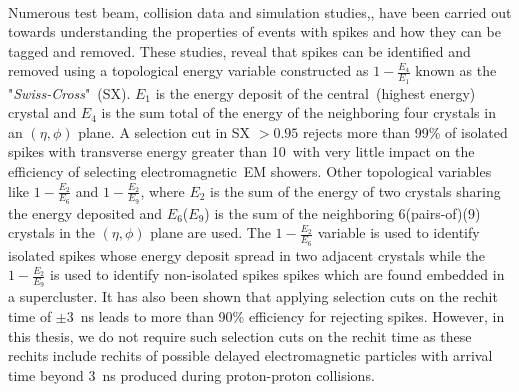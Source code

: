 \paragraph*{}
Numerous test beam, collision data and simulation studies,\cite{spike}, have been carried out towards understanding the properties of events with spikes and how they can be tagged and removed. 
These studies, reveal that spikes can be identified and removed using a topological energy variable constructed as $1 - \frac{E_{4}}{E_{1}}$ known as the "\textit{Swiss-Cross}"~(SX). $E_{1}$ is the energy deposit of the central~(highest energy) crystal and $E_{4}$ is the sum total of the energy of the neighboring four crystals in an $(\eta , \phi)$ plane. A selection cut in SX $ > 0.95$ rejects more than 99\% of isolated spikes with transverse energy greater than 10~\GeV with very little impact on the efficiency of selecting electromagnetic~{EM} showers.
Other topological variables like $ 1 - \frac{E_{2}}{E_{6}}$ and $ 1 - \frac{E_{2}}{E_{9}} $, where $E_{2}$ is the sum of the energy of two  crystals sharing the energy deposited and $E_{6}$($E_{9}$) is the sum of the neighboring 6(pairs-of)(9) crystals in the $(\eta , \phi)$ plane are used. The $ 1 - \frac{E_{2}}{E_{6}} $ variable is used to identify isolated spikes whose energy deposit spread in two adjacent crystals while the  $ 1 - \frac{E_{2}}{E_{9}} $ is used to identify  non-isolated spikes \ie spikes which are found embedded in a supercluster.
It has also been shown that applying selection cuts on the rechit time of $ \pm 3$~ns leads to more than 90\% efficiency for rejecting spikes. However, in this thesis, we do not require such selection cuts on the rechit time as these rechits include rechits of possible delayed electromagnetic particles with arrival time beyond 3~ns produced during proton-proton collisions.
